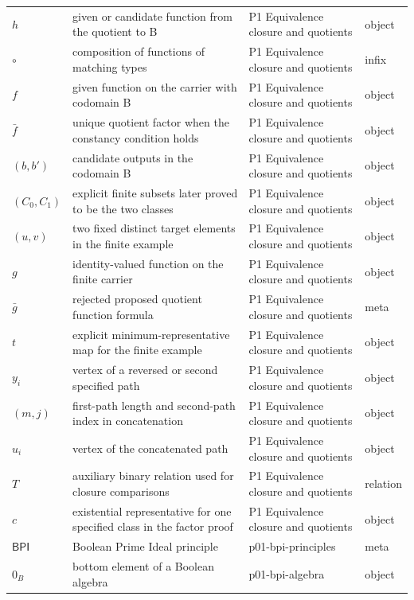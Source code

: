 \begin{longtable}{@{}p{}p{}p{}p{}@{}}
\(h\) & given or candidate function from the quotient to B & P1 Equivalence closure and quotients & object \\
\(\circ\) & composition of functions of matching types & P1 Equivalence closure and quotients & infix \\
\(f\) & given function on the carrier with codomain B & P1 Equivalence closure and quotients & object \\
\(\bar f\) & unique quotient factor when the constancy condition holds & P1 Equivalence closure and quotients & object \\
\((b,\allowbreak b')\) & candidate outputs in the codomain B & P1 Equivalence closure and quotients & object \\
\((C_0,\allowbreak C_1)\) & explicit finite subsets later proved to be the two classes & P1 Equivalence closure and quotients & object \\
\((u,\allowbreak v)\) & two fixed distinct target elements in the finite example & P1 Equivalence closure and quotients & object \\
\(g\) & identity-valued function on the finite carrier & P1 Equivalence closure and quotients & object \\
\(\bar g\) & rejected proposed quotient function formula & P1 Equivalence closure and quotients & meta \\
\(t\) & explicit minimum-representative map for the finite example & P1 Equivalence closure and quotients & object \\
\(y_i\) & vertex of a reversed or second specified path & P1 Equivalence closure and quotients & object \\
\((m,\allowbreak j)\) & first-path length and second-path index in concatenation & P1 Equivalence closure and quotients & object \\
\(u_i\) & vertex of the concatenated path & P1 Equivalence closure and quotients & object \\
\(T\) & auxiliary binary relation used for closure comparisons & P1 Equivalence closure and quotients & relation \\
\(c\) & existential representative for one specified class in the factor proof & P1 Equivalence closure and quotients & object \\
\(\mathsf{BPI}\) & Boolean Prime Ideal principle & p01-\allowbreak{}bpi-\allowbreak{}principles & meta \\
\(0_B\) & bottom element of a Boolean algebra & p01-\allowbreak{}bpi-\allowbreak{}algebra & object \\

\end{longtable}
